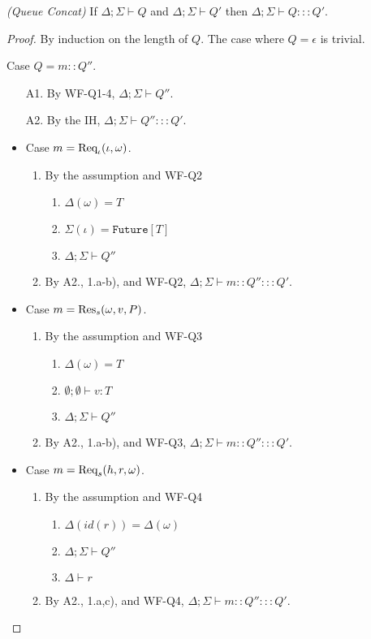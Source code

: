 \begin{thm}
\emph{(Queue Concat)}\label{lem:queue-concat}
If $\Delta ; \Sigma \vdash Q$ and $\Delta ; \Sigma \vdash Q'$ then $\Delta ; \Sigma \vdash Q ::: Q'$.
\end{thm}
\begin{proof}
By induction on the length of $Q$. The case where $Q = \epsilon$ is trivial.

Case $Q = m :: Q''$.
\begin{enumerate}
\item[A1.] By WF-Q1-4, $\Delta ; \Sigma \vdash Q''$.
\item[A2.] By the IH, $\Delta ; \Sigma \vdash Q'' ::: Q'$.
\end{enumerate}

\begin{itemize}
\item Case $m = {\textrm{Req}_{\iota}(\iota, \omega)}$.
\begin{enumerate}
\item By the assumption and WF-Q2
  \begin{enumerate}[label=(\alph*)]
  \item $\Delta(\omega) = T$
  \item $\Sigma(\iota) = \texttt{Future}[T]$
  \item $\Delta ; \Sigma \vdash Q''$
  \end{enumerate}
\item By A2., 1.a-b), and WF-Q2, $\Delta ; \Sigma \vdash m :: Q'' ::: Q'$.
\end{enumerate}

\item Case $m = {\textrm{Res}_s(\omega, v, P)}$.
\begin{enumerate}
\item By the assumption and WF-Q3
  \begin{enumerate}[label=(\alph*)]
  \item $\Delta(\omega) = T$
  \item $\emptyset ; \emptyset \vdash v : T$
  \item $\Delta ; \Sigma \vdash Q''$
  \end{enumerate}
\item By A2., 1.a-b), and WF-Q3, $\Delta ; \Sigma \vdash m :: Q'' ::: Q'$.
\end{enumerate}

\item Case $m = {\textrm{Req}_s(h, r, \omega)}$.
\begin{enumerate}
\item By the assumption and WF-Q4
  \begin{enumerate}[label=(\alph*)]
  \item $\Delta(id(r)) = \Delta(\omega)$
  \item $\Delta ; \Sigma \vdash Q''$
  \item $\Delta \vdash r$
  \end{enumerate}
\item By A2., 1.a,c), and WF-Q4, $\Delta ; \Sigma \vdash m :: Q'' ::: Q'$.
\end{enumerate}
\end{itemize}
\end{proof}

